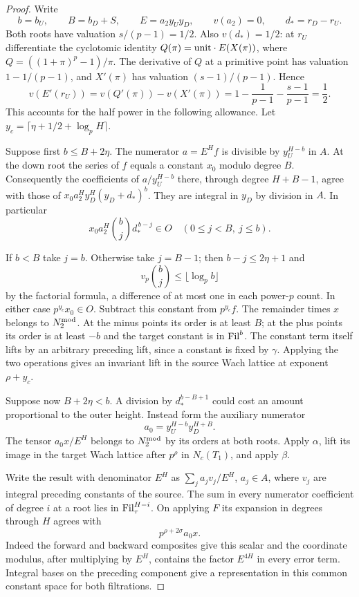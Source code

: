 \begin{proof}
Write
\[
 b=b_U,\qquad B=b_D+S,\qquad
 E=a_2 y_U y_D,\qquad v(a_2)=0,\qquad d_*=r_D-r_U.
\]
Both roots have valuation \(s/(p-1)=1/2\). Also
\(v(d_*)=1/2\): at \(r_U\) differentiate the cyclotomic identity
\(Q(\pi)={\rm unit}\cdot E(X(\pi))\), where
\(Q=((1+\pi)^p-1)/\pi\). The derivative of \(Q\) at a primitive
point has valuation \(1-1/(p-1)\), and \(X'(\pi)\) has valuation
\((s-1)/(p-1)\). Hence
\[
 v(E'(r_U))=v(Q'(\pi))-v(X'(\pi))=1-\frac1{p-1}-\frac{s-1}{p-1}=\frac12.
\]
This accounts for the half power in the following allowance.
Let \(y_c=\lceil\eta+1/2+\log_p H\rceil\).

Suppose first \(b\le B+2\eta\). The numerator \(a=E^H f\) is
divisible by \(y_U^{H-b}\) in \(A\). At the down root the series
of \(f\) equals a constant \(x_0\) modulo degree \(B\).
Consequently the coefficients of \(a/y_U^{H-b}\) there, through
degree \(H+B-1\), agree with those of
\(x_0 a_2^H y_D^H(y_D+d_*)^b\). They are integral in \(y_D\)
by division in \(A\). In particular
\[
           x_0a_2^H \binom{b}{j} d_*^{\,b-j}\in O
                   \quad (0\le j<B,\ j\le b).
\]

If \(b<B\) take \(j=b\). Otherwise take \(j=B-1\); then
\(b-j\le2\eta+1\) and
\[
 v_p\binom{b}{j}\le\lfloor\log_p b\rfloor
\]
by the factorial formula, a difference of at most one in each
power-\(p\) count. In either case \(p^{y_c}x_0\in O\).
Subtract this constant from \(p^{y_c}f\). The remainder times
\(x\) belongs to \(N^{\rm mod}_2\). At the minus points its
order is at least \(B\); at the plus points its order is at
least \(-b\) and the target constant is in \({\rm Fil}^b\).
The constant term itself lifts by an arbitrary preceding lift,
since a constant is fixed by \(\gamma\). Applying the two operations
gives an invariant lift in the source Wach lattice at exponent \(\rho+y_c\).

Suppose now \(B+2\eta<b\). A division by \(d_*^{b-B+1}\) could
cost an amount proportional to the outer height. Instead form the
auxiliary numerator
\[
 a_0=y_U^{H-b}y_D^{H+B}.
\]
The tensor
\(a_0 x/E^H\) belongs to \(N^{\rm mod}_2\) by its orders at both
roots. Apply \(\alpha\), lift its image in the target Wach lattice after \(p^\rho\)
in \(N_c(T_1)\), and apply \(\beta\).

Write the result with denominator
\(E^H\) as \(\sum_j a_j v_j/E^H\), \(a_j\in A\), where \(v_j\)
are integral preceding constants of the source. The sum in every
numerator coefficient of degree \(i\) at a root lies in
\({\rm Fil}^{H-i}_\tau\). On applying \(F\) its expansion in degrees
through \(H\) agrees with
\[
                  p^{\rho+2\sigma}a_0 x .
\]
Indeed the forward and backward composites give this scalar and the
coordinate modulus, after multiplying by \(E^H\), contains the
factor \(E^{4H}\) in every error term. Integral bases on the preceding
component give a representation in this common constant space for
both filtrations.


\end{proof}
